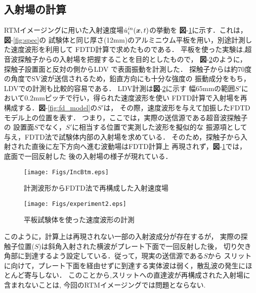 \subsection{入射場の計算}
RTMイメージングに用いた入射速度場$\dot{u}_i^{in}(\boldsymbol{x},t)$の挙動を
{\bf 図}-\ref{fig:inc_btm}に示す．これは，{\bf 図}-\ref{fig:spec}の
試験体と同じ厚さ(12mm)のアルミニウム平板を用い，別途計測した速度波形を利用して
FDTD計算で求めたものである．
平板を使った実験は,超音波探触子からの入射場を把握することを目的としたもので，
{\bf 図}-\ref{fig:experiment2}のように，探触子設置面と反対の側からLDV
で表面振動を計測した．
%
探触子からは約70度の角度でSV波が送信されるため，鉛直方向にも十分な強度の
振動成分をもち，LDVでの計測も比較的容易である．
%
LDV計測は{\bf 図}-\ref{fig:experiment2}に示す
幅65mmの範囲$S'$において0.2mmピッチで行い，得られた速度波形を使い
FDTD計算で入射場を再構成する．{\bf 図}-\ref{fig:fd_model}の$S'$は，
その際，速度波形を与えて加振したFDTDモデル上の位置を表す．
つまり，ここでは，実際の送信源である超音波探触子の
設置面$S$でなく，$S'$に相当する位置で実測した波形を擬似的な
振源項として与え，FDTD法で試験体内部の入射場を求めている．
そのため，探触子から入射された直後に左下方向へ進む波動場はFDTD計算上
再現されず，{\bf 図}-\ref{fig:inc_btm}では，底面で一回反射した
後の入射場の様子が現れている．
\begin{figure}[thb]
\centering
	\texttt{[image: Figs/IncBtm.eps]}
	\caption{計測波形からFDTD法で再構成した入射速度場}
	\label{fig:inc_btm}
\end{figure}
\begin{figure}[hbt]
\centering
	\texttt{[image: Figs/experiment2.eps]}
	\caption{平板試験体を使った速度波形の計測}
	\label{fig:experiment2}
\end{figure}
このように，計算上は再現されない一部の入射波成分が存在するが，
実際の探触子位置($S$)は斜角入射された横波がプレート下面で一回反射した後，
切り欠き角部に到達するよう設定している．従って，現実の送信源である$S$から
スリットに向けて，プレート下面を経由せずに到達する実体波は弱く，散乱波の発生にほとんど寄与しない．
このことから,スリットへの直達波が再構成された入射場に含まれないことは,
今回のRTMイメージングでは問題とならない.
